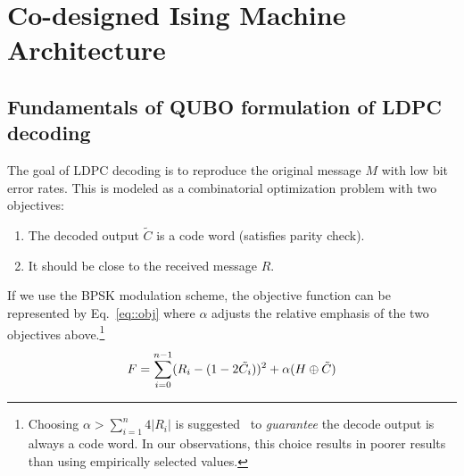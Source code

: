 \section {Co-designed Ising Machine Architecture}
\label{sec:arch}


\subsection{Fundamentals of QUBO formulation of LDPC decoding}
\label{sec:QUBO_formulation}

The goal of LDPC decoding is to reproduce the original message $M$ with low bit error rates. 
This is modeled as a combinatorial optimization problem with two objectives: \begin{enumerate}
    \item The decoded output $\tilde{C}$ is a code word (satisfies parity check).
    \item It should be close to the received message $R$.
\end{enumerate}
If we use the BPSK modulation scheme, the objective function can be represented by Eq.~\ref{eq::obj}
where $\alpha$ adjusts the relative emphasis of the two objectives above.\footnote{Choosing $\alpha > \sum_{i=1}^{n} 4|R_i|$ is suggested~\cite{tawada2020new} to \emph{guarantee} the decode output is always a code word. In our observations, this choice results in poorer results than using empirically selected values.} \begin{equation}
\label{eq::obj}
\begin{split}
    F =  \sum_{i=0}^{n-1}(R_i - (1-2\tilde{C_i}))^2 + \alpha (H \xor \tilde{C})
\end{split}
\end{equation}

